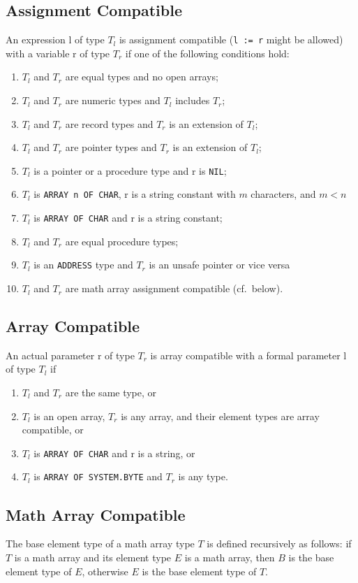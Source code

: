 \documentclass[a4wide,11pt]{article}
\begin{document}
\subsection{Assignment Compatible}
An expression l of type $T_l$ is assignment compatible (\lstinline"l := r" might be allowed) with a variable r of type $T_r$ if one of the following conditions hold:
\begin{enumerate}
\item $T_l$ and $T_r$ are equal types and no open arrays;
\item $T_l$ and $T_r$ are numeric types and $T_l$ includes $T_r$;
\item $T_l$ and $T_r$ are record types and $T_r$ is an extension of $T_l$;
\item $T_l$ and $T_r$ are pointer types and $T_r$ is an extension of $T_l$;
\item $T_l$ is a pointer or a procedure type and r is \lstinline"NIL";
\item $T_l$ is \lstinline"ARRAY n OF CHAR", r is a string constant with $m$ characters, and $m < n$
\item $T_l$ is \lstinline"ARRAY OF CHAR" and r is a string constant;
\item $T_l$ and $T_r$ are equal procedure types;
\item $T_l$ is an \lstinline"ADDRESS" type and $T_r$ is an unsafe pointer or vice versa
\item $T_l$ and $T_r$ are math array assignment compatible (cf.\ below).
\end{enumerate}

\subsection{Array Compatible}
An actual parameter r of type $T_r$ is array compatible with a formal parameter l of type $T_l$ if
\begin{enumerate}
\item $T_l$ and $T_r$ are the same type, or
\item $T_l$ is an open array, $T_r$ is any array, and their element types are array compatible, or
\item $T_l$ is \lstinline"ARRAY OF CHAR" and r is a string, or
\item $T_l$ is \lstinline"ARRAY OF SYSTEM.BYTE" and $T_r$ is any type.
\end{enumerate}

\subsection{Math Array Compatible}
The base element type of a math array type $T$ is defined recursively as follows: if $T$ is a math array and its element type $E$ is a math array, then $B$ is the base element type of $E$, otherwise $E$ is the base element type of $T$.
\end{document}
